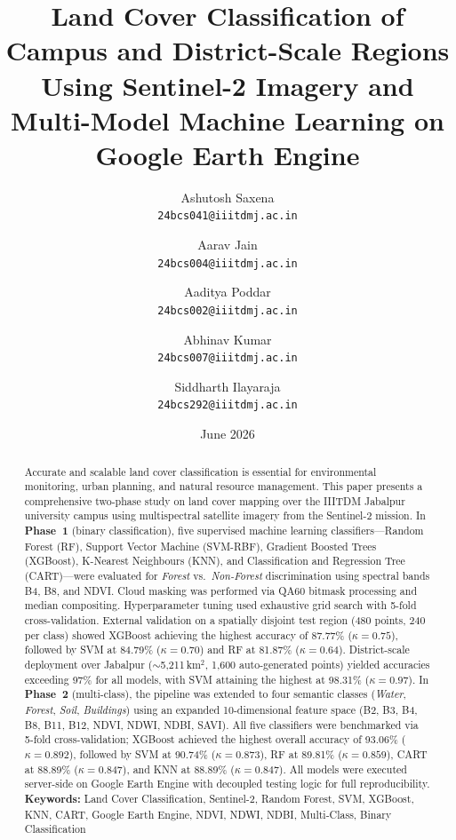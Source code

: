 \documentclass[12pt, a4paper, twocolumn]{article}
\title{
    \vspace{-1cm}
    \textbf{\Large Land Cover Classification of Campus and District-Scale Regions Using Sentinel-2 Imagery and Multi-Model Machine Learning on Google Earth Engine}
    \vspace{0.3cm}
}
\author{
    Ashutosh Saxena \\ \small\texttt{24bcs041@iiitdmj.ac.in} \and 
    Aarav Jain \\ \small\texttt{24bcs004@iiitdmj.ac.in} \and 
    Aaditya Poddar \\ \small\texttt{24bcs002@iiitdmj.ac.in} \and 
    Abhinav Kumar \\ \small\texttt{24bcs007@iiitdmj.ac.in} \and 
    Siddharth Ilayaraja \\ \small\texttt{24bcs292@iiitdmj.ac.in}
}
\date{June 2026}
\begin{document}
\onecolumn
\maketitle
\begin{abstract}
\noindent
Accurate and scalable land cover classification is essential for environmental monitoring, urban planning, and natural resource management.
This paper presents a comprehensive two-phase study on land cover mapping over the IIITDM Jabalpur university campus using multispectral satellite imagery from the Sentinel-2 mission.
In \textbf{Phase~1} (binary classification), five supervised machine learning classifiers---Random Forest (RF), Support Vector Machine (SVM-RBF), Gradient Boosted Trees (XGBoost), K-Nearest Neighbours (KNN), and Classification and Regression Tree (CART)---were evaluated for \textit{Forest} vs.\ \textit{Non-Forest} discrimination using spectral bands B4, B8, and NDVI.
Cloud masking was performed via QA60 bitmask processing and median compositing. Hyperparameter tuning used exhaustive grid search with 5-fold cross-validation.
External validation on a spatially disjoint test region (480 points, 240 per class) showed XGBoost achieving the highest accuracy of 87.77\% ($\kappa = 0.75$), followed by SVM at 84.79\% ($\kappa = 0.70$) and RF at 81.87\% ($\kappa = 0.64$).
District-scale deployment over Jabalpur ($\sim$5,211\,km$^2$, 1,600 auto-generated points) yielded accuracies exceeding 97\% for all models, with SVM attaining the highest at 98.31\% ($\kappa = 0.97$).
In \textbf{Phase~2} (multi-class), the pipeline was extended to four semantic classes (\textit{Water}, \textit{Forest}, \textit{Soil}, \textit{Buildings}) using an expanded 10-dimensional feature space (B2, B3, B4, B8, B11, B12, NDVI, NDWI, NDBI, SAVI).
All five classifiers were benchmarked via 5-fold cross-validation; XGBoost achieved the highest overall accuracy of 93.06\% ($\kappa = 0.892$), followed by SVM at 90.74\% ($\kappa = 0.873$), RF at 89.81\% ($\kappa = 0.859$), CART at 88.89\% ($\kappa = 0.847$), and KNN at 88.89\% ($\kappa = 0.847$).
All models were executed server-side on Google Earth Engine with decoupled testing logic for full reproducibility.
\vspace{0.3cm}
\noindent\textbf{Keywords:} Land Cover Classification, Sentinel-2, Random Forest, SVM, XGBoost, KNN, CART, Google Earth Engine, NDVI, NDWI, NDBI, Multi-Class, Binary Classification
\end{abstract}

\twocolumn
\end{document}
